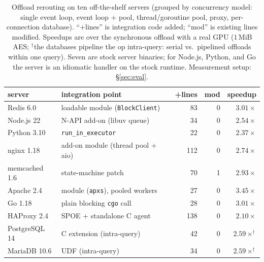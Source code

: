 \begin{table}[t]
  \centering
  \small
  \begin{tabular}{llrrr}
    \toprule
    server & integration point & +lines & mod & speedup \\
    \midrule
    Redis 6.0        & loadable module (\texttt{BlockClient})     & 83  & 0 & $3.01\times$ \\
    Node.js 22       & N-API add-on (libuv queue)                 & 34  & 0 & $2.54\times$ \\
    Python 3.10      & \texttt{run\_in\_executor}                 & 22  & 0 & $2.37\times$ \\
    nginx 1.18       & add-on module (thread pool + aio)          & 112 & 0 & $2.74\times$ \\
    memcached 1.6    & state-machine patch                        & 70  & 1 & $2.93\times$ \\
    Apache 2.4       & module (\texttt{apxs}), pooled workers     & 27  & 0 & $3.45\times$ \\
    Go 1.18          & plain blocking \texttt{cgo} call           & 28  & 0 & $3.01\times$ \\
    HAProxy 2.4      & SPOE + standalone C agent                  & 138 & 0 & $2.10\times$ \\
    PostgreSQL 14    & C extension (intra-query)                  & 42  & 0 & $2.59\times^\dagger$ \\
    MariaDB 10.6     & UDF (intra-query)                          & 34  & 0 & $2.59\times^\dagger$ \\
    \bottomrule
  \end{tabular}
  \caption{Offload rerouting on ten off-the-shelf servers (grouped by concurrency model: single event
    loop, event loop + pool, thread/goroutine pool, proxy, per-connection database). ``+lines'' is
    integration code added; ``mod'' is existing lines modified. Speedups are over the synchronous
    offload with a real GPU ($1$\,MiB AES; $^\dagger$the databases pipeline the op intra-query:
    serial vs.\ pipelined offloads within one query). Seven are stock server binaries; for Node.js, Python, and Go the server is an
    idiomatic handler on the stock runtime. Measurement setup: \S\ref{sec:eval}.}
  \label{tab:servers}
\end{table}

